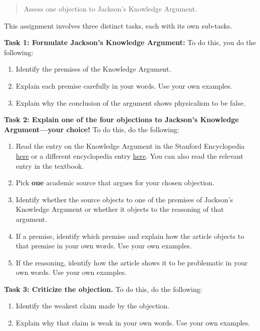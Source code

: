 \documentclass[]{article}
\providecommand{\tightlist}{%
  \setlength{\itemsep}{0pt}\setlength{\parskip}{0pt}}
\begin{document}
\begin{quote}
Assess one objection to Jackson's Knowledge Argument.
\end{quote}

This assignment involves three distinct tasks, each with its own
sub-tasks.

\textbf{Task 1: Formulate Jackson's Knowledge Argument:} To do this, you
do the following:

\begin{enumerate}
\def\labelenumi{\arabic{enumi}.}
\tightlist
\item
  Identify the premises of the Knowledge Argument.
\item
  Explain each premise carefully in your words. Use your own examples.
\item
  Explain why the conclusion of the argument shows physicalism to be
  false.
\end{enumerate}

\textbf{Task 2: Explain one of the four objections to Jackson's
Knowledge Argument---your choice!} To do this, do the following:

\begin{enumerate}
\def\labelenumi{\arabic{enumi}.}
\tightlist
\item
  Read the entry on the Knowledge Argument in the Stanford Encyclopedia
  \href{https://plato.stanford.edu/entries/qualia-knowledge}{here} or a
  different encyclopedia entry
  \href{http://www.iep.utm.edu/know-arg/}{here}. You can also read the
  relevant entry in the textbook.
\item
  Pick \textbf{one} academic source that argues for your chosen
  objection.
\item
  Identify whether the source objects to one of the premises of
  Jackson's Knowledge Argument or whether it objects to the reasoning of
  that argument.
\item
  If a premise, identify which premise and explain how the article
  objects to that premise in your own words. Use your own examples.
\item
  If the reasoning, identify how the article shows it to be problematic
  in your own words. Use your own examples.
\end{enumerate}

\textbf{Task 3: Criticize the objection.} To do this, do the following:

\begin{enumerate}
\def\labelenumi{\arabic{enumi}.}
\tightlist
\item
  Identify the weakest claim made by the objection.
\item
  Explain why that claim is weak in your own words. Use your own
  examples.
\end{enumerate}
\end{document}
